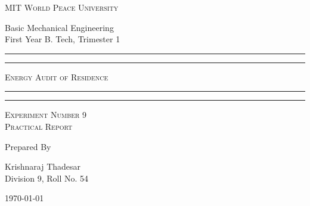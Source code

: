 \documentclass[11pt,a4paper]{article}
\begin{document}
	
	\begin{titlepage} 
		\centering 
		
		
		\huge\textsc{
			MIT World Peace University
		}\\
	
		\vspace{0.75\baselineskip} %
		
		\LARGE{
			Basic Mechanical Engineering\\
			First Year B. Tech, Trimester 1
		}
		
		\vfill %
		
		
		\rule{\textwidth}{1.6pt}\vspace*{-\baselineskip}\vspace*{2pt}
		\rule{\textwidth}{0.6pt}
		\vspace{0.4\baselineskip} %
		
		
		
		\huge{\textsc{
				Energy Audit of Residence
			}} \\
		
		
		
		\vspace{0.5\baselineskip} %
		\rule{\textwidth}{0.6pt}\vspace*{-\baselineskip}\vspace*{2.8pt}
		\rule{\textwidth}{1.6pt}
		
		\vspace{1\baselineskip} %

			
		\LARGE\textsc{
			Experiment Number 9\\Practical Report
		} %
		\vfill
		
		
		Prepared By
		\vspace{0.5\baselineskip} %
		
		\Large{
			Krishnaraj Thadesar \\
			Division 9, Roll No. 54
		}
		
		
		\vspace{0.5\baselineskip} %
		\today

	\end{titlepage}
	
\end{document}
